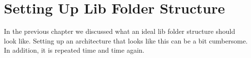 \maketitle{}
\section{ Setting Up Lib Folder Structure }

In the previous chapter we discussed what an ideal lib folder structure should
look like. Setting up an architecture that looks like this can be a bit
cumbersome. In addition, it is repeated time and time again.

